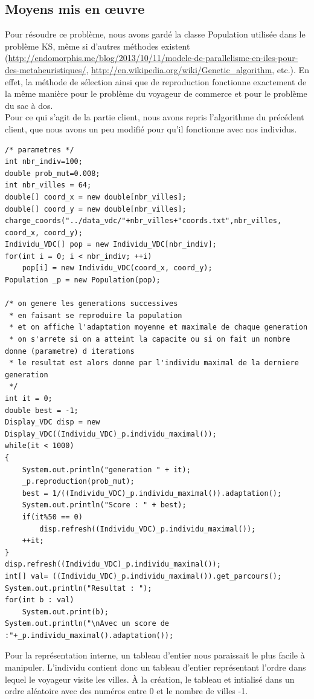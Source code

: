 \documentclass{article}
\begin{document}
\subsection{Moyens mis en \oe uvre}
Pour résoudre ce problème, nous avons gardé la classe Population utilisée dans le problème KS, même si d'autres méthodes existent (\url{http://endomorphis.me/blog/2013/10/11/modele-de-parallelisme-en-iles-pour-des-metaheuristiques/}, \url{http://en.wikipedia.org/wiki/Genetic_algorithm}, etc.). En effet, la méthode de sélection ainsi que de reproduction fonctionne exactement de la même manière pour le problème du voyageur de commerce et pour le problème du sac à dos.\\
Pour ce qui s'agit de la partie client, nous avons repris l'algorithme du précédent client, que nous avons un peu modifié pour qu'il fonctionne avec nos individus.
\begin{verbatim}
/* parametres */ 
int nbr_indiv=100;
double prob_mut=0.008;
int nbr_villes = 64;
double[] coord_x = new double[nbr_villes];
double[] coord_y = new double[nbr_villes];
charge_coords("../data_vdc/"+nbr_villes+"coords.txt",nbr_villes, coord_x, coord_y);
Individu_VDC[] pop = new Individu_VDC[nbr_indiv];
for(int i = 0; i < nbr_indiv; ++i)
	pop[i] = new Individu_VDC(coord_x, coord_y);
Population _p = new Population(pop);

/* on genere les generations successives
 * en faisant se reproduire la population
 * et on affiche l'adaptation moyenne et maximale de chaque generation
 * on s'arrete si on a atteint la capacite ou si on fait un nombre donne (parametre) d iterations
 * le resultat est alors donne par l'individu maximal de la derniere generation
 */
int it = 0;
double best = -1;
Display_VDC disp = new Display_VDC((Individu_VDC)_p.individu_maximal());
while(it < 1000)
{
	System.out.println("generation " + it);
	_p.reproduction(prob_mut);
	best = 1/((Individu_VDC)_p.individu_maximal()).adaptation();
	System.out.println("Score : " + best);
	if(it%50 == 0)
		disp.refresh((Individu_VDC)_p.individu_maximal());
	++it;
}
disp.refresh((Individu_VDC)_p.individu_maximal());
int[] val= ((Individu_VDC)_p.individu_maximal()).get_parcours();
System.out.println("Resultat : ");
for(int b : val)
	System.out.print(b);
System.out.println("\nAvec un score de :"+_p.individu_maximal().adaptation());
\end{verbatim}
Pour la représentation interne, un tableau d'entier nous paraissait le plus facile à manipuler. L'individu contient donc un tableau d'entier représentant l'ordre dans lequel le voyageur visite les villes. À la création, le tableau et intialisé dans un ordre aléatoire avec des numéros entre 0 et le nombre de villes -1.
\end{document}
